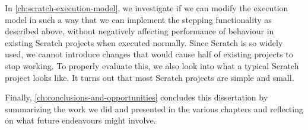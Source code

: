 \documentclass[main]{subfiles}
\begin{document}
In \cref{ch:scratch-execution-model}, we investigate if we can modify the execution model in such a way that we can implement the stepping functionality as described above, without negatively affecting performance of behaviour in existing Scratch projects when executed normally.
Since Scratch is so widely used, we cannot introduce changes that would cause half of existing projects to stop working.
To properly evaluate this, we also look into what a typical Scratch project looks like.
It turns out that most Scratch projects are simple and small.

Finally, \cref{ch:conclusions-and-opportunities} concludes this dissertation by summarizing the work we did and presented in the various chapters and reflecting on what future endeavours might involve.
\end{document}
